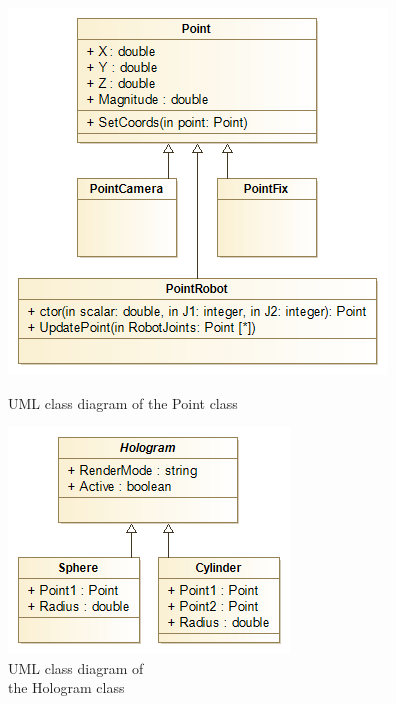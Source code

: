 \begin{figure}[!h]
	\begin{minipage}{0.65\textwidth}
		\centering
		\includegraphics[width=0.8\linewidth]{Figures/Implementation_Points}
		\caption{UML class diagram of the Point class}
		\label{Ffig:ImplementationPoints}
	\end{minipage}\hfill
	\begin{minipage}{0.35\textwidth}
		\centering
		\includegraphics[width=1\linewidth]{Figures/Implementation_Holograms}
		\caption{UML class diagram of\\the Hologram class}
		\label{Fig:ImplementationHolograms}
	\end{minipage}
\end{figure}

